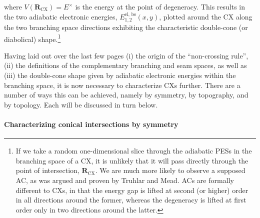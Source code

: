 \documentclass[9pt,bestpractices,pubversion]{livecoms}
\newcommand{\R}{\mathbf{R}}
\begin{document}
where $V(\R_{\text{CX}}) = E^\times$ is the energy at the point of degeneracy.\cite{sicilia2007quadratic, fdez_galvan_analytical_2016}
This results in the two adiabatic electronic energies, $E_{1,2}^{\text{el, bs}}(x,y)$, plotted around the CX along the two branching space directions exhibiting the characteristic double-cone (or diabolical)\cite{yarkony_diabolical_1996, yarkony_conical_1998} shape.\footnote{
If we take a random one-dimensional slice through the adiabatic PESs in the branching space of a CX, it is unlikely that it will pass directly through the point of intersection, $\R_\text{CX}$. 
We are much more likely to observe a supposed AC, as was argued and proven by Truhlar and Mead.\cite{truhlar_relative_2003}
ACs are formally different to CXs, in that the energy gap is lifted at second (or higher) order in all directions around the former, whereas the degeneracy is lifted at first order only in two directions around the latter.\cite{levine2007isomerization}
}

Having laid out over the last few pages (i) the origin of the “non-crossing rule”, (ii) the definitions of the complementary branching and seam spaces, as well as (iii) the double-cone shape given by adiabatic electronic energies within the branching space, it is now necessary to characterize CXs further. 
There are a number of ways this can be achieved, namely by symmetry, by topography, and by topology. 
Each will be discussed in turn below.

\paragraph{Characterizing conical intersections by symmetry}
\label{ch2_sym}
\end{document}
